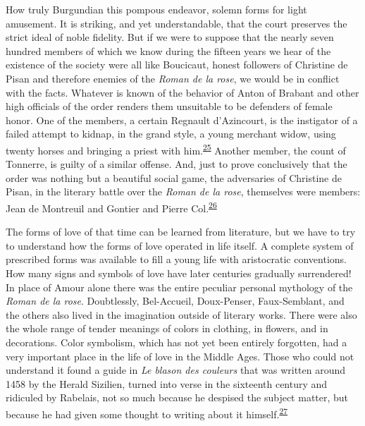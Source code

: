How truly Burgundian this pompous endeavor, solemn forms for light
amusement. It is striking, and yet understandable, that the court
preserves the strict ideal of noble fidelity. But if we were to suppose
that the nearly seven hundred members of which we know during the
fifteen years we hear of the existence of the society were all like
Boucicaut, honest followers of Christine de Pisan and therefore enemies
of the \emph{Roman de la rose}, we would be in conflict with the facts.
Whatever is known of the behavior of Anton of Brabant and other high
officials of the order renders them unsuitable to be defenders of female
honor. One of the members, a certain Regnault d'Azincourt, is the
instigator of a failed attempt to kidnap, in the grand style, a young
merchant widow, using twenty horses and bringing a priest with
him.\textsuperscript{\protect\hypertarget{11_Chapter_Four__THE_FORMS_OF_LOVE.xhtmlux5cux23id_1438}{\protect\hyperlink{23_NOTES.xhtmlux5cux23id_1439}{25}}}
Another member, the count of Tonnerre, is guilty of a similar offense.
And, just to prove conclusively that the order was nothing but a
beautiful social game, the adversaries of Christine de Pisan, in the
literary battle over the \emph{Roman de la rose}, themselves were
members: Jean de Montreuil and Gontier and Pierre
Col.\textsuperscript{\protect\hypertarget{11_Chapter_Four__THE_FORMS_OF_LOVE.xhtmlux5cux23id_1436}{\protect\hyperlink{23_NOTES.xhtmlux5cux23id_1437}{26}}}

The forms of love of that time can be learned from literature, but we
have to try to understand how the forms of love operated in life itself.
A complete system of prescribed forms was available to fill a young life
with aristocratic conventions. How many signs and symbols of love have
later centuries gradually surrendered! In place of Amour alone there was
the entire peculiar personal mythology of the \emph{Roman de la rose}.
Doubtlessly, Bel-Accueil, Doux-Penser, Faux-Semblant, and the others
also lived in the
\protect\hypertarget{11_Chapter_Four__THE_FORMS_OF_LOVE.xhtmlux5cux23page_142}{}{}imagination
outside of literary works. There were also the whole range of tender
meanings of colors in clothing, in flowers, and in decorations. Color
symbolism, which has not yet been entirely forgotten, had a very
important place in the life of love in the Middle Ages. Those who could
not understand it found a guide in \emph{Le blason des couleurs} that
was written around 1458 by the Herald Sizilien, turned into verse in the
sixteenth century and ridiculed by Rabelais, not so much because he
despised the subject matter, but because he had given some thought to
writing about it
himself.\textsuperscript{\protect\hypertarget{11_Chapter_Four__THE_FORMS_OF_LOVE.xhtmlux5cux23id_1435}{\protect\hyperlink{23_NOTES.xhtmlux5cux23page_413}{27}}}

